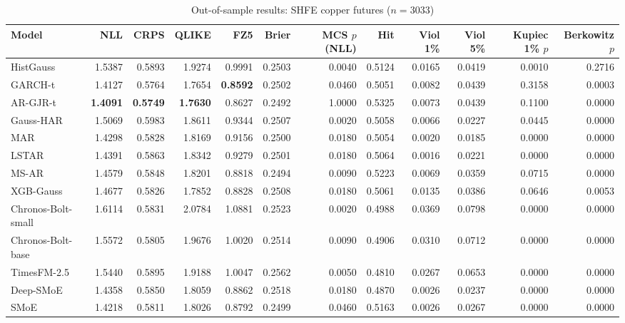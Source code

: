 \begin{table}[!htbp]\centering\scriptsize
\caption{Out-of-sample results: SHFE copper futures ($n=3033$)}\label{tab:asset_cu_main}
\begin{adjustbox}{max width=\textwidth}
\begin{tabular}{lrrrrrrrrrrr}
\toprule
Model & NLL & CRPS & QLIKE & FZ5 & Brier & MCS $p$ (NLL) & Hit & Viol 1\% & Viol 5\% & Kupiec 1\% $p$ & Berkowitz $p$\\
\midrule
HistGauss & 1.5387 & 0.5893 & 1.9274 & 0.9991 & 0.2503 & 0.0040 & 0.5124 & 0.0165 & 0.0419 & 0.0010 & 0.2716\\
GARCH-t & 1.4127 & 0.5764 & 1.7654 & \textbf{0.8592} & 0.2502 & 0.0460 & 0.5051 & 0.0082 & 0.0439 & 0.3158 & 0.0003\\
AR-GJR-t & \textbf{1.4091} & \textbf{0.5749} & \textbf{1.7630} & 0.8627 & 0.2492 & 1.0000 & 0.5325 & 0.0073 & 0.0439 & 0.1100 & 0.0000\\
Gauss-HAR & 1.5069 & 0.5983 & 1.8611 & 0.9344 & 0.2507 & 0.0020 & 0.5058 & 0.0066 & 0.0227 & 0.0445 & 0.0000\\
MAR & 1.4298 & 0.5828 & 1.8169 & 0.9156 & 0.2500 & 0.0180 & 0.5054 & 0.0020 & 0.0185 & 0.0000 & 0.0000\\
LSTAR & 1.4391 & 0.5863 & 1.8342 & 0.9279 & 0.2501 & 0.0180 & 0.5064 & 0.0016 & 0.0221 & 0.0000 & 0.0000\\
MS-AR & 1.4579 & 0.5848 & 1.8201 & 0.8818 & 0.2494 & 0.0090 & 0.5223 & 0.0069 & 0.0359 & 0.0715 & 0.0000\\
XGB-Gauss & 1.4677 & 0.5826 & 1.7852 & 0.8828 & 0.2508 & 0.0180 & 0.5061 & 0.0135 & 0.0386 & 0.0646 & 0.0053\\
Chronos-Bolt-small & 1.6114 & 0.5831 & 2.0784 & 1.0881 & 0.2523 & 0.0020 & 0.4988 & 0.0369 & 0.0798 & 0.0000 & 0.0000\\
Chronos-Bolt-base & 1.5572 & 0.5805 & 1.9676 & 1.0020 & 0.2514 & 0.0090 & 0.4906 & 0.0310 & 0.0712 & 0.0000 & 0.0000\\
TimesFM-2.5 & 1.5440 & 0.5895 & 1.9188 & 1.0047 & 0.2562 & 0.0050 & 0.4810 & 0.0267 & 0.0653 & 0.0000 & 0.0000\\
Deep-SMoE & 1.4358 & 0.5850 & 1.8059 & 0.8862 & 0.2518 & 0.0180 & 0.4870 & 0.0026 & 0.0237 & 0.0000 & 0.0000\\
SMoE & 1.4218 & 0.5811 & 1.8026 & 0.8792 & 0.2499 & 0.0460 & 0.5163 & 0.0026 & 0.0267 & 0.0000 & 0.0000\\
\bottomrule
\end{tabular}
\end{adjustbox}
\end{table}